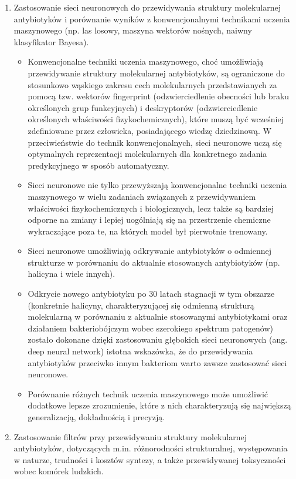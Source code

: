 \begin{enumerate}
    \item Zastosowanie sieci neuronowych do przewidywania struktury molekularnej antybiotyków i porównanie wyników z konwencjonalnymi technikami uczenia maszynowego (np. las losowy, maszyna wektorów nośnych, naiwny klasyfikator Bayesa).

    \begin{itemize}
    \item Konwencjonalne techniki uczenia maszynowego, choć umożliwiają przewidywanie struktury molekularnej antybiotyków, są ograniczone do stosunkowo wąskiego zakresu cech molekularnych przedstawianych za pomocą tzw. wektorów fingerprint (odzwierciedlenie obecności lub braku określonych grup funkcyjnych) i deskryptorów (odzwierciedlenie określonych właściwości fizykochemicznych), które muszą być wcześniej zdefiniowane przez człowieka, posiadającego wiedzę dziedzinową. W przeciwieństwie do technik konwencjonalnych, sieci neuronowe uczą się optymalnych reprezentacji molekularnych dla konkretnego zadania predykcyjnego w sposób automatyczny.
    \item Sieci neuronowe nie tylko przewyższają konwencjonalne techniki uczenia maszynowego w wielu zadaniach związanych z przewidywaniem właściwości fizykochemicznych i biologicznych, lecz także są bardziej odporne na zmiany i lepiej uogólniają się na przestrzenie chemiczne wykraczające poza te, na których model był pierwotnie trenowany.
    \item Sieci neuronowe umożliwiają odkrywanie antybiotyków o odmiennej strukturze w porównaniu do aktualnie stosowanych antybiotyków (np. halicyna i wiele innych).
    \item Odkrycie nowego antybiotyku po 30 latach stagnacji w tym obszarze  (konkretnie halicyny, charakteryzującej się odmienną strukturą molekularną w porównaniu z aktualnie stosowanymi antybiotykami oraz działaniem bakteriobójczym wobec szerokiego spektrum patogenów) zostało dokonane dzięki zastosowaniu głębokich sieci neuronowych (ang. deep neural network) \- istotna wskazówka, że do przewidywania antybiotyków przeciwko innym bakteriom warto zawsze zastosować sieci neuronowe.
    \item Porównanie różnych technik uczenia maszynowego może umożliwić dodatkowe lepsze zrozumienie, które z nich charakteryzują się największą generalizacją, dokładnością i precyzją.
    \end{itemize}
    \item Zastosowanie filtrów przy przewidywaniu struktury molekularnej antybiotyków, dotyczących m.in. różnorodności strukturalnej, występowania w naturze, trudności i kosztów syntezy, a także przewidywanej toksyczności wobec komórek ludzkich.

\end{enumerate}
